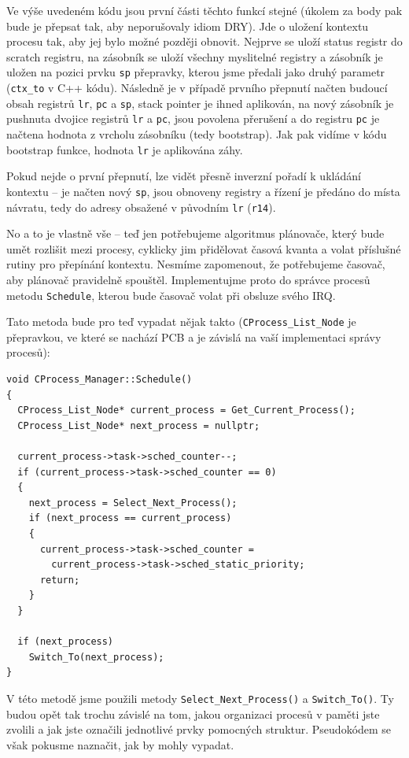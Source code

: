 \documentclass{article}
\begin{document}
Ve výše uvedeném kódu jsou první části těchto funkcí stejné (úkolem za body pak bude je přepsat tak, aby neporušovaly idiom DRY). Jde o uložení kontextu procesu tak, aby jej bylo možné později obnovit. Nejprve se uloží status registr do scratch registru, na zásobník se uloží všechny myslitelné registry a zásobník je uložen na pozici prvku \texttt{sp} přepravky, kterou jsme předali jako druhý parametr (\texttt{ctx\_to} v C++ kódu). Následně je v případě prvního přepnutí načten budoucí obsah registrů \texttt{lr}, \texttt{pc} a \texttt{sp}, stack pointer je ihned aplikován, na nový zásobník je pushnuta dvojice registrů \texttt{lr} a \texttt{pc}, jsou povolena přerušení a do registru \texttt{pc} je načtena hodnota z vrcholu zásobníku (tedy bootstrap). Jak pak vidíme v kódu bootstrap funkce, hodnota \texttt{lr} je aplikována záhy.

Pokud nejde o první přepnutí, lze vidět přesně inverzní pořadí k ukládání kontextu -- je načten nový \texttt{sp}, jsou obnoveny registry a řízení je předáno do místa návratu, tedy do adresy obsažené v původním \texttt{lr} (\texttt{r14}).

No a to je vlastně vše -- teď jen potřebujeme algoritmus plánovače, který bude umět rozlišit mezi procesy, cyklicky jim přidělovat časová kvanta a volat příslušné rutiny pro přepínání kontextu. Nesmíme zapomenout, že potřebujeme časovač, aby plánovač pravidelně spouštěl. Implementujme proto do správce procesů metodu \texttt{Schedule}, kterou bude časovač volat při obsluze svého IRQ.

Tato metoda bude pro teď vypadat nějak takto (\texttt{CProcess\_List\_Node} je přepravkou, ve které se nachází PCB a je závislá na vaší implementaci správy procesů):

\begin{lstlisting}
void CProcess_Manager::Schedule()
{
  CProcess_List_Node* current_process = Get_Current_Process();
  CProcess_List_Node* next_process = nullptr;
	
  current_process->task->sched_counter--;
  if (current_process->task->sched_counter == 0)
  {
    next_process = Select_Next_Process();
    if (next_process == current_process)
    {
      current_process->task->sched_counter =
        current_process->task->sched_static_priority; 
      return;
    }
  }

  if (next_process)
    Switch_To(next_process);
}
\end{lstlisting}

V této metodě jsme použili metody \texttt{Select\_Next\_Process()} a \texttt{Switch\_To()}. Ty budou opět tak trochu závislé na tom, jakou organizaci procesů v paměti jste zvolili a jak jste označili jednotlivé prvky pomocných struktur. Pseudokódem se však pokusme naznačit, jak by mohly vypadat.
\end{document}
